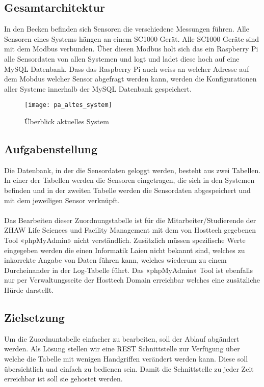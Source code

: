 \documentclass[../main.tex]{subfiles}
\begin{document}
	\subsection{Gesamtarchitektur}
	In den Becken befinden sich Sensoren die verschiedene Messungen führen. Alle Sensoren eines Systems hängen an einem SC1000 Gerät. Alle SC1000 Geräte sind mit dem Modbus verbunden. Über diesen Modbus holt sich das ein Raspberry Pi alle Sensordaten von allen Systemen und logt und ladet diese hoch auf eine MySQL Datenbank. Dass das Raspberry Pi auch weiss an welcher Adresse auf dem Mobdus welcher Sensor abgefragt werden kann, werden die Konfigurationen aller Systeme innerhalb der MySQL Datenbank gespeichert.
	\begin{figure}[H]
		\centering
		\texttt{[image: pa\_altes\_system]}
		\caption{Überblick aktuelles System}
		\label{fig:pa_altes_system}
	\end{figure}
	
	\subsection{Aufgabenstellung}
	Die Datenbank, in der die Sensordaten geloggt werden, besteht aus zwei Tabellen. In einer der Tabellen werden die Sensoren eingetragen, die sich in den Systemen befinden und in der zweiten Tabelle werden die Sensordaten abgespeichert und mit dem jeweiligen Sensor verknüpft. \\
	\\	
	Das Bearbeiten dieser Zuordnungstabelle ist für die Mitarbeiter/Studierende der ZHAW Life Sciences und Facility Management mit dem von Hosttech gegebenen Tool «phpMyAdmin» nicht verständlich. Zusätzlich müssen spezifische Werte eingegeben werden die einen Informatik Laien nicht bekannt sind, welches zu inkorrekte Angabe von Daten führen kann, welches wiederum zu einem Durcheinander in der Log-Tabelle führt. 
	Das «phpMyAdmin» Tool ist ebenfalls nur per Verwaltungsseite der Hosttech Domain erreichbar welches eine zusätzliche Hürde darstellt.
	
	\subsection{Zielsetzung}
	Um die Zuordnuntabelle einfacher zu bearbeiten, soll der Ablauf abgändert werden. Als Lösung stellen wir eine REST Schnittstelle zur Verfügung über welche die Tabelle mit wenigen Handgriffen verändert werden kann. 
	Diese soll übersichtlich und einfach zu bedienen sein. Damit die Schnittstelle zu jeder Zeit erreichbar ist soll sie gehostet werden.
\end{document}
